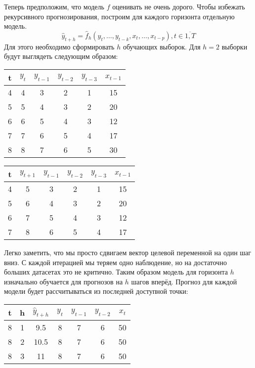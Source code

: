 \documentclass[12pt,fleqn]{article}
\begin{document}
Теперь предположим, что модель $f$ оценивать не очень дорого. Чтобы избежать рекурсивного прогнозирования, построим для каждого горизонта отдельную модель. 
$$
\hat{y}_{t+h} = \hat{f}_h(y_t, \ldots, y_{t-k}, x_{t}, \ldots, x_{t-p}), t \in \overline{1, T}
$$
Для этого необходимо сформировать $h$ обучающих выборок. Для $h=2$ выборки будут выглядеть следующим образом:

\begin{table}[!h]
	 	\centering
	\begin{tabular}[t]{|c|c|cccc|}
		\hline
		t & $y_t$ & $y_{t-1}$ & $y_{t-2}$ & $y_{t-3}$ & $x_{t-1}$ \\ \hline
		4 & 4              & 3                  & 2         & 1         & 15        \\
		5 & 5              & 4                  & 3         & 2         & 20        \\
		6 & 6              & 5                  & 4         & 3         & 12        \\
		7 & 7              & 6                  & 5         & 4         & 17        \\
		8 & 8              & 7                  & 6         & 5         & 30        \\ \hline
	\end{tabular}
	\quad
		\begin{tabular}[t]{|c|c|cccc|}
			\hline
			t & $y_{t+1}$      & $y_{t-1}$ & $y_{t-2}$ & $y_{t-3}$ & $x_{t-1}$ \\ \hline
			4 & 5                & 3                  & 2         & 1         & 15        \\
			5 & 6                & 4                  & 3         & 2         & 20        \\
			6 & 7                & 5                  & 4         & 3         & 12        \\
			7 & 8                & 6                  & 5         & 4         & 17        \\ \hline
		\end{tabular}
\end{table}

Легко заметить, что мы просто сдвигаем вектор целевой переменной на один шаг вниз. С каждой итерацией мы теряем одно наблюдение, но на достаточно больших датасетах это не критично. Таким образом модель для горизонта $h$ изначально обучается для прогнозов на $h$ шагов вперёд. Прогноз для каждой модели будет рассчитываться из последней доступной точки:

\begin{table}[!h]
	\centering
	\begin{tabular}{|cc|ccccc|}
		\hline
		t & h & $\hat{y}_{t+h}$ & $y_t$ & $y_{t-1}$ & $y_{t-2}$ & $x_{t}$ \\ \hline
		8 & 1 & 9.5             & 8     & 7         & 6         & 50      \\
		8 & 2 & 10.5            & 8     & 7         & 6         & 50      \\
		8 & 3 & 11              & 8     & 7         & 6         & 50      \\ \hline
	\end{tabular}
\end{table}
\end{document}
